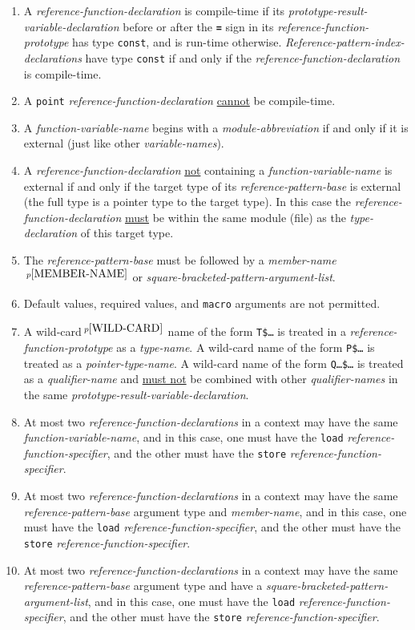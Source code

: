 \documentclass[12pt]{article}
\newcommand{\TT}[1]{{\tt \bfseries #1}}
\newcommand{\pagnote}[1]{$\,^{p\pageref{#1}}$}
\begin{document}
\begin{enumerate}
\item
A {\em reference-function-declaration} is compile-time if
its {\em prototype-result-variable-declara\-tion} before or after the
\TT{=} sign in its {\em reference-function-prototype}
has type {\tt const}, and is run-time otherwise.
{\em Reference-pattern-index-declarations} have type {\tt const}
if and only if the {\em reference-function-declaration} is compile-time.
\item
A {\tt point} {\em reference-function-declaration}
\underline{cannot} be compile-time.
\item
A {\em function-variable-name} begins with a {\em module-abbreviation}
if and only if it is external (just like other {\em variable-names}).
\item
A {\em reference-function-declaration} \underline{not} containing
a {\em function-variable-name} is external if and only if the
target type of its {\em reference-pattern-base} is external
(the full type is a pointer type to the target type).  In this case
the {\em reference-function-declaration} \underline{must} be within
the same module (file) as the {\em type-declaration} of this target type.
\item
The {\em reference-pattern-base} must be
followed by
a {\em member-name}\pagnote{MEMBER-NAME} or
{\em square-bracketed-pattern-argument-list}.
\item
Default values, required values, and {\tt macro} arguments
are not permitted.
\item
A wild-card\pagnote{WILD-CARD} name of the form {\tt T\$\ldots}
is treated in a {\em reference-function-prototype} as a {\em type-name}.
A wild-card name of the form {\tt P\$\ldots} is treated as a
{\em pointer-type-name}.
A wild-card name of the form {\tt Q\ldots\$\ldots} is treated as a
{\em qualifier-name} and \underline{must not} be combined with
other {\em qualifier-names} in the same
{\em prototype-result-variable-declaration}.
\item At most two {\em reference-function-declarations} in a context
may have the same {\em function-variable-name}, and in this case,
one must have the {\tt load} {\em reference-function-specifier},
and the other must have the {\tt store}
{\em reference-function-specifier}.
\item At most two {\em reference-function-declarations} in a context
may have the same {\em reference-pattern-base} argument type and
{\em member-name}, and in this case,
one must have the {\tt load} {\em reference-function-specifier},
and the other must have the {\tt store}
{\em reference-function-specifier}.
\item At most two {\em reference-function-declarations} in a context
may have the same {\em reference-pattern-base} argument type and
have a {\em square-bracketed-pattern-argument-list}, and in this case,
one must have the {\tt load} {\em reference-function-specifier},
and the other must have the {\tt store}
{\em reference-function-specifier}.
\end{enumerate}
\end{document}
